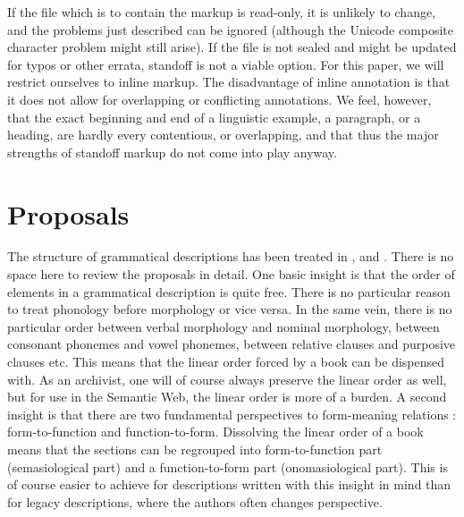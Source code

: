 \documentclass[a4paper,10pt]{article}
\begin{document}
If the file which is to contain the markup is read-only, it is unlikely to change, and the problems just described can be ignored (although the Unicode composite character problem might still arise). If the file is not sealed and might be updated for typos or other errata, standoff is not a viable option. For this paper, we will restrict ourselves to inline markup. The disadvantage of inline annotation is that it does not allow for overlapping or conflicting annotations. We feel, however, that the exact beginning and end of a linguistic example, a paragraph, or a heading, are hardly every contentious, or overlapping, and that thus the major strengths of standoff markup do not come into play anyway.


% 
% 
\section{Proposals}
The structure of grammatical descriptions has been treated in \citet{Lehmann1980,Lehmann1989comparativegrammar,Lehmann1993, Lehmann1998, Lehmann2004funkt, LehmannEtAl2004, Lehmann2004docu,Good2004}, and \citet{Nordhoff2008jldc}. There is no space here to review the proposals in detail. One basic insight is that the order of elements in a grammatical description is quite free. There is no particular reason to treat phonology before morphology or vice versa. In the same vein, there is no particular order between verbal morphology and nominal morphology, between consonant phonemes and vowel phonemes, between relative clauses and purposive clauses etc. This means that the linear order forced by a book can be dispensed with. As an archivist, one will of course always preserve the linear order as well, but for use in the Semantic Web, the linear order is more of a burden. A second insight is that there are two fundamental perspectives to form-meaning relations \citep{Gabelentz1891, LehmannEtAl2004, Mosel2006craft,Nordhoff2008jldc, Nordhofffcfufomp}: form-to-function and function-to-form. Dissolving the linear order of a book means that the sections can be regrouped into form-to-function part (semasiological part) and a function-to-form part (onomasiological part). This is of course easier to achieve for descriptions written with this insight in mind than for legacy descriptions, where the authors often changes perspective.
\end{document}
